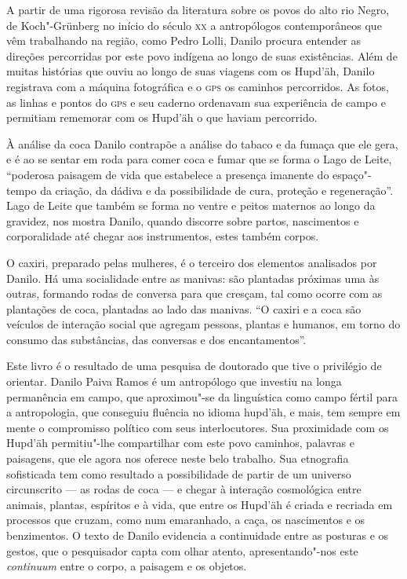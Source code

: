 A partir de uma rigorosa revisão da literatura sobre os povos do alto
rio Negro, de Koch"-Grünberg no início do século \textsc{xx} a antropólogos
contemporâneos que vêm trabalhando na região, como Pedro Lolli, Danilo
procura entender as direções percorridas por este povo indígena ao longo
de suas existências. Além de muitas histórias que ouviu ao longo de suas
viagens com os Hupd'äh, Danilo registrava com a máquina fotográfica e o
\textsc{gps} os caminhos percorridos. As fotos, as linhas e pontos do \textsc{gps} e seu
caderno ordenavam sua experiência de campo e permitiam rememorar com os
Hupd'äh o que haviam percorrido.

À análise da coca Danilo contrapõe a análise do tabaco e da fumaça que
ele gera, e é ao se sentar em roda para comer coca e fumar que se forma
o Lago de Leite, ``poderosa paisagem de vida que estabelece a presença
imanente do espaço"-tempo da criação, da dádiva e da possibilidade de
cura, proteção e regeneração''. Lago de Leite que também se forma no
ventre e peitos maternos ao longo da gravidez, nos mostra Danilo, quando
discorre sobre partos, nascimentos e corporalidade até chegar aos
instrumentos, estes também corpos.

O caxiri, preparado pelas mulheres, é o terceiro dos elementos
analisados por Danilo. Há uma socialidade entre as manivas: são
plantadas próximas uma às outras, formando rodas de conversa para que
cresçam, tal como ocorre com as plantações de coca, plantadas ao lado
das manivas. ``O caxiri e a coca são veículos de interação social que
agregam pessoas, plantas e humanos, em torno do consumo das substâncias,
das conversas e dos encantamentos''.

Este livro é o resultado de uma pesquisa de doutorado que tive o
privilégio de orientar. Danilo Paiva Ramos é um antropólogo que investiu
na longa permanência em campo, que aproximou"-se da linguística como
campo fértil para a antropologia, que conseguiu fluência no idioma
hupd'äh, e mais, tem sempre em mente o compromisso político com seus
interlocutores. Sua proximidade com os Hupd'äh permitiu"-lhe compartilhar
com este povo caminhos, palavras e paisagens, que ele agora nos oferece
neste belo trabalho. Sua etnografia sofisticada tem como resultado a
possibilidade de partir de um universo circunscrito --- as rodas de coca
--- e chegar à interação cosmológica entre animais, plantas, espíritos e
à vida, que entre os Hupd'äh é criada e recriada em processos que
cruzam, como num emaranhado, a caça, os nascimentos e os benzimentos. O
texto de Danilo evidencia a continuidade entre as posturas e os gestos,
que o pesquisador capta com olhar atento, apresentando"-nos este
\textit{continuum} entre o corpo, a paisagem e os objetos.

